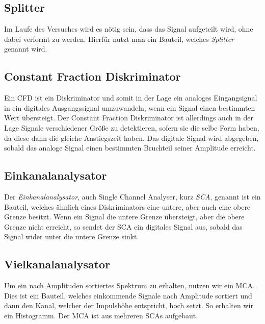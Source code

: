 \documentclass[11pt, ngerman, fleqn, DIV=15, headinclude, BCOR=2cm]{scrreprt}
\begin{document}
\subsection{Splitter}


Im Laufe des Versuches wird es nötig sein, dass das Signal aufgeteilt wird,
ohne dabei verformt zu werden. Hierfür nutzt man ein Bauteil, welches
\emph{Splitter}
genannt wird. 

\subsection{Constant Fraction Diskriminator}

Ein CFD ist ein Diskriminator und somit in der Lage ein analoges
Eingangsignal in ein digitales Ausgangssignal umzuwandeln, wenn ein Signal einen
bestimmten Wert übersteigt.
Der Constant Fraction Diskriminator ist allerdings auch in der Lage Signale
verschiedener Größe zu detektieren, sofern sie die selbe Form haben, da diese
dann die gleiche Anstiegszeit haben. Das digitale Signal wird abgegeben, sobald
das analoge Signal einen bestimmten Bruchteil seiner Amplitude erreicht.


\subsection{Einkanalanalysator}


Der \emph{Einkanalanalysator}, auch Single Channel Analyser, kurz \emph{SCA}, genannt ist ein
Bauteil, welches ähnlich eines Diskriminators eine untere, aber auch eine obere
Grenze besitzt. Wenn ein Signal die untere Grenze übersteigt, aber die obere
Grenze nicht erreicht, so sendet der SCA ein digitales Signal aus, sobald das
Signal wider unter die untere Grenze sinkt.

\subsection{Vielkanalanalysator}

Um ein nach Amplituden sortiertes Spektrum zu erhalten, nutzen wir ein MCA.
Dies ist ein Bauteil, welches einkommende Signale nach Amplitude sortiert und
dann den Kanal, welcher der Impulshöhe entspricht, hoch setzt. So erhalten wir ein
Histogramm. Der MCA ist aus mehreren SCAs aufgebaut.

\end{document}
